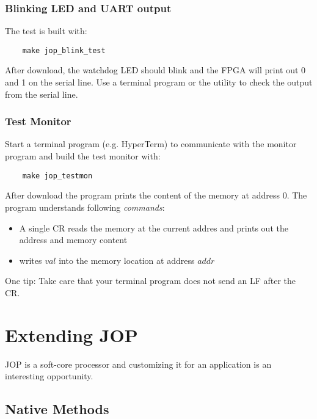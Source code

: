 \subsubsection{Blinking LED and UART output}

The test is built with:
%
\begin{verbatim}
    make jop_blink_test
\end{verbatim}
%
After download, the watchdog LED should blink and the FPGA will print
out 0 and 1 on the serial line. Use a terminal program or the utility
 to check the output from the serial line.

\subsubsection{Test Monitor}

Start a terminal program (e.g. HyperTerm) to communicate with the
monitor program and build the test monitor with:
%
\begin{verbatim}
    make jop_testmon
\end{verbatim}
%
After download the program prints the content of the memory at
address 0. The program understands following \emph{commands}:

\begin{itemize}
    \item A single CR reads the memory at the current addres
    and prints out the address and memory content
    \item {} writes $val$ into the memory location at
    address $addr$
\end{itemize}

One tip: Take care that your terminal program does not send an LF
after the CR.


\section{Extending JOP}


JOP is a soft-core processor and customizing it for an application
is an interesting opportunity.

\subsection{Native Methods}

